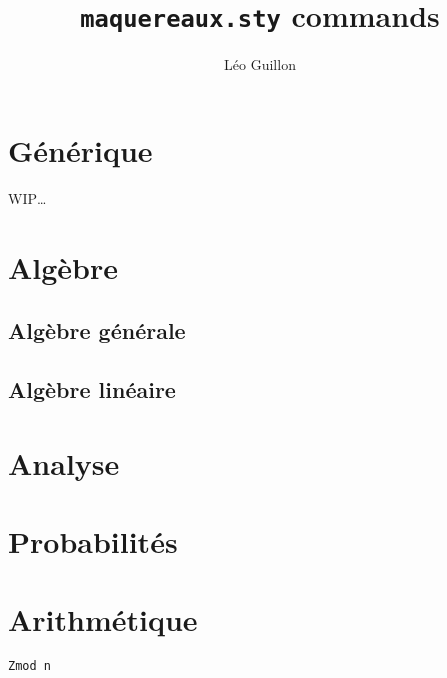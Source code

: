 \documentclass{article}
\title{\texttt{maquereaux.sty} commands}
\author{Léo Guillon}
\date{}
\begin{document}
\maketitle

\tableofcontents

\section{Générique}

WIP…

\section{Algèbre}

\subsection{Algèbre générale}

\subsection{Algèbre linéaire}

\section{Analyse}

\section{Probabilités}

\section{Arithmétique}

\texttt{Zmod n}
\end{document}
